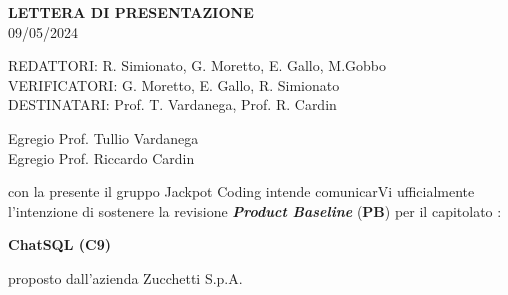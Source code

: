 \documentclass[5pt]{article}
\begin{document}
	\vspace{24pt}
	
	\begin{center}
		\textbf{\LARGE LETTERA DI PRESENTAZIONE}\\
		09/05/2024
	\end{center}
	
	\vspace{13pt}
	
	\begin{flushleft}
		\begin{spacing}{1.5}
			REDATTORI: R. Simionato, G. Moretto, E. Gallo, M.Gobbo\\%
			VERIFICATORI: G. Moretto, E. Gallo, R. Simionato\\
			\vspace{7pt}
			DESTINATARI: Prof. T. Vardanega, Prof. R. Cardin\\%
		\end{spacing}
	\end{flushleft}
	
	
	\restoregeometry	
	\pagebreak
	
\begin{flushleft}
	Egregio Prof. Tullio Vardanega\\
	Egregio Prof. Riccardo Cardin\\
\end{flushleft}

\begin{flushleft}
	con la presente il gruppo Jackpot Coding intende comunicarVi ufficialmente l'intenzione di sostenere la revisione \textbf{\textit{Product Baseline}} (\textbf{PB}) per il capitolato :
\end{flushleft}

\begin{center}
	\textbf{ChatSQL (C9)}
\end{center}
proposto dall'azienda Zucchetti S.p.A.\\
\end{document}
